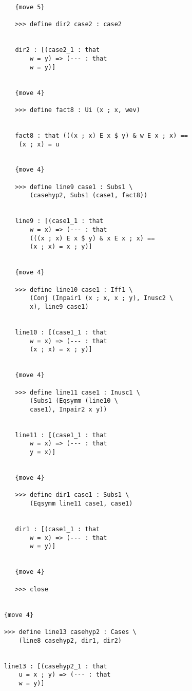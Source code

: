 \documentclass[12pt]{article}
\begin{document}
\begin{verbatim}
               {move 5}

               >>> define dir2 case2 : case2


               dir2 : [(case2_1 : that 
                   w = y) => (--- : that 
                   w = y)]


               {move 4}

               >>> define fact8 : Ui (x ; x, wev)


               fact8 : that (((x ; x) E x $ y) & w E x ; x) == 
                (x ; x) = u


               {move 4}

               >>> define line9 case1 : Subs1 \
                   (casehyp2, Subs1 (case1, fact8))


               line9 : [(case1_1 : that 
                   w = x) => (--- : that 
                   (((x ; x) E x $ y) & x E x ; x) == 
                   (x ; x) = x ; y)]


               {move 4}

               >>> define line10 case1 : Iff1 \
                   (Conj (Inpair1 (x ; x, x ; y), Inusc2 \
                   x), line9 case1)


               line10 : [(case1_1 : that 
                   w = x) => (--- : that 
                   (x ; x) = x ; y)]


               {move 4}

               >>> define line11 case1 : Inusc1 \
                   (Subs1 (Eqsymm (line10 \
                   case1), Inpair2 x y))


               line11 : [(case1_1 : that 
                   w = x) => (--- : that 
                   y = x)]


               {move 4}

               >>> define dir1 case1 : Subs1 \
                   (Eqsymm line11 case1, case1)


               dir1 : [(case1_1 : that 
                   w = x) => (--- : that 
                   w = y)]


               {move 4}

               >>> close


            {move 4}

            >>> define line13 casehyp2 : Cases \
                (line8 casehyp2, dir1, dir2)


            line13 : [(casehyp2_1 : that 
                u = x ; y) => (--- : that 
                w = y)]



\end{verbatim}
\end{document}
